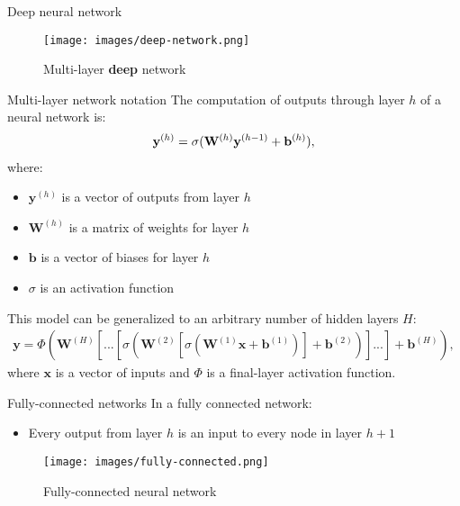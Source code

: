 \documentclass[
  ignorenonframetext,
]{beamer}
\providecommand{\tightlist}{%
  \setlength{\itemsep}{0pt}\setlength{\parskip}{0pt}}
\begin{document}
\begin{frame}{Deep neural network}
\protect\hypertarget{deep-neural-network}{}
\begin{figure}
\centering
\texttt{[image: images/deep-network.png]}
\caption{Multi-layer \textbf{deep} network}
\end{figure}
\end{frame}

\begin{frame}{Multi-layer network notation}
\protect\hypertarget{multi-layer-network-notation}{}
The computation of outputs through layer \(h\) of a neural network is:
\begin{align*}
\mathbf{y}^{(h)} = \sigma ( \mathbf{W}^{(h)} \mathbf{y}^{(h-1)} + \mathbf{b}^{(h)} ), \vspace{-1em}
\end{align*} where:

\begin{itemize}
\tightlist
\item
  \(\mathbf{y}^{(h)}\) is a vector of outputs from layer \(h\)
\item
  \(\mathbf{W}^{(h)}\) is a matrix of weights for layer \(h\)
\item
  \(\mathbf{b}\) is a vector of biases for layer \(h\)
\item
  \(\sigma\) is an activation function
\end{itemize}

This model can be generalized to an arbitrary number of hidden layers
\(H\): \begin{align*}
\mathbf{y} = \Phi ( \mathbf{W}^{(H)}[...[\sigma ( \mathbf{W}^{(2)}  [\sigma (\mathbf{W}^{(1)} \mathbf{x} + \mathbf{b}^{(1)})] + \mathbf{b}^{(2)})]...] + \mathbf{b}^{(H)}),
\end{align*} where \(\mathbf{x}\) is a vector of inputs and \(\Phi\) is
a final-layer activation function.
\end{frame}

\begin{frame}{Fully-connected networks}
\protect\hypertarget{fully-connected-networks}{}
In a fully connected network:

\begin{itemize}
\tightlist
\item
  Every output from layer \(h\) is an input to every node in layer
  \(h+1\)
\end{itemize}

\begin{figure}
\centering
\texttt{[image: images/fully-connected.png]}
\caption{Fully-connected neural network}
\end{figure}
\end{frame}
\end{document}

